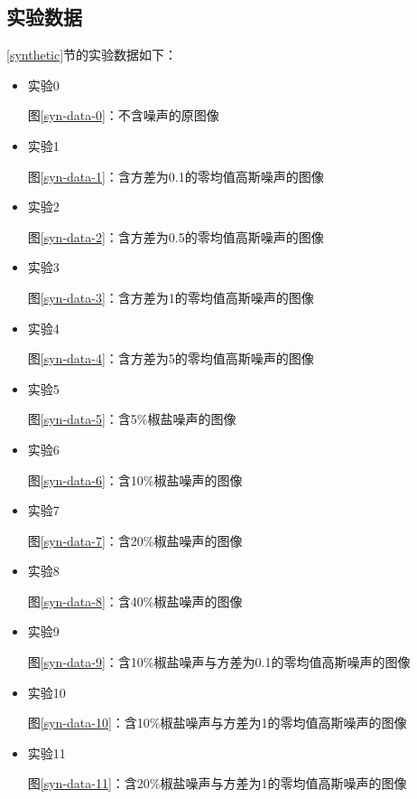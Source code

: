 \documentclass[12pt, a4paper]{article}
\begin{document}
\subsection{实验数据}
\par \ref{synthetic}节的实验数据如下：
\begin{itemize}
\item 实验0
\par 图\ref{syn-data-0}：不含噪声的原图像
		
\item 实验1
\par 图\ref{syn-data-1}：含方差为0.1的零均值高斯噪声的图像
		
\item 实验2
\par 图\ref{syn-data-2}：含方差为0.5的零均值高斯噪声的图像
		
\item 实验3
\par 图\ref{syn-data-3}：含方差为1的零均值高斯噪声的图像
		
\item 实验4
\par 图\ref{syn-data-4}：含方差为5的零均值高斯噪声的图像

\item 实验5
\par 图\ref{syn-data-5}：含5\%椒盐噪声的图像
\item 实验6
\par 图\ref{syn-data-6}：含10\%椒盐噪声的图像
\item 实验7
\par 图\ref{syn-data-7}：含20\%椒盐噪声的图像
\item 实验8
\par 图\ref{syn-data-8}：含40\%椒盐噪声的图像

\item 实验9
\par 图\ref{syn-data-9}：含10\%椒盐噪声与方差为0.1的零均值高斯噪声的图像
\item 实验10
\par 图\ref{syn-data-10}：含10\%椒盐噪声与方差为1的零均值高斯噪声的图像
\item 实验11
\par 图\ref{syn-data-11}：含20\%椒盐噪声与方差为1的零均值高斯噪声的图像
\end{itemize}
\end{document}
